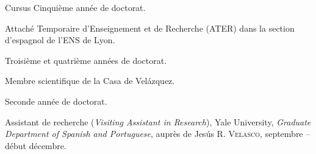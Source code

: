  \begin{rubric}{Cursus}
                                \entry*[2022-2023]
                            Cinquième année de doctorat.
                    
                                \entry*
                            Attaché Temporaire d'Enseignement et de Recherche (ATER) dans la section
                        d'espagnol de l'ENS de Lyon.
                    
                                \entry*[2020-2022]
                            Troisième et quatrième années de doctorat.
                    
                                \entry*
                            Membre scientifique de la Casa de Velázquez.
                    
                                \entry*[2019-2020]
                            Seconde année de doctorat.
                    
                                \entry*
                            Assistant de recherche (\textit{Visiting Assistant in Research}), Yale
                        University, \textit{Graduate Department of Spanish and Portuguese}, auprès de
                        Jesús R. \textsc{Velasco}, septembre -- début décembre. 
                    

\end{rubric}

